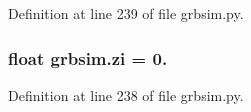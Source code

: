 Definition at line 239 of file grbsim.\-py.

\hypertarget{namespacegrbsim_a2dc4a4cc63263968b10c425626689c6d}{
\subsubsection[{zi}]{\setlength{\rightskip}{0pt plus 5cm}float grbsim.\-zi = 0.}}\label{namespacegrbsim_a2dc4a4cc63263968b10c425626689c6d}


Definition at line 238 of file grbsim.\-py.

